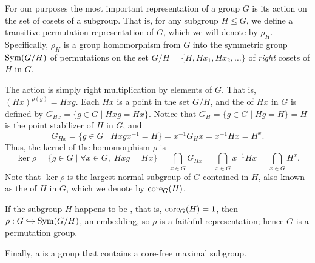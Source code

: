 For our purposes the most important representation of a group $G$ is its action 
on the set of cosets of a subgroup.  That is, for any subgroup $H\leq G$,
we define a transitive permutation representation of $G$, which we
will denote by $\rho_H$.  Specifically, $\rho_H$ is a group homomorphism
from $G$ into the symmetric group $\operatorname{Sym}(G/H)$ of permutations on the set $G/H =
\{H, Hx_1, Hx_2, \dots \}$ of \emph{right} cosets of $H$ in $G$.  

The action is simply right multiplication by elements of $G$. That is,
$(Hx)^{\rho(g)}= Hxg$.
Each $Hx$ is a point in the set $G/H$, and the
 of $Hx$ in $G$ is defined by
$G_{Hx} = \{g\in G \mid Hxg = Hx \}$.  Notice that 
$G_H = \{g\in G \mid Hg = H \} = H$ is the point stabilizer of $H$ in $G$, and 
\[
G_{Hx} =\{g\in G \mid Hxgx^{-1}  = H \} = 
x^{-1} G_H x  = x^{-1} H x = H^x.
\]
Thus, the kernel of the homomorphism $\rho$ is 
\[
\ker \rho = \{g\in G \mid \forall x \in G,\; Hxg = Hx \} = 
\bigcap_{x\in G}G_{Hx} = \bigcap_{x\in G} x^{-1} H x  = \bigcap_{x\in G} H^x.
\]
Note that $\ker \rho$ is the largest normal subgroup of $G$ 
contained in $H$, also known as the  of $H$ in $G$, which we denote
by $\operatorname{core}_G(H)$.

If the subgroup $H$ happens to be , that is,
$\operatorname{core}_G(H)=1$, 
then $\rho : G \hookrightarrow \operatorname{Sym}(G/H)$, an embedding, so 
$\rho$ is a faithful representation; hence $G$ is a permutation group.

Finally, a  is a group that
contains a core-free maximal subgroup.




